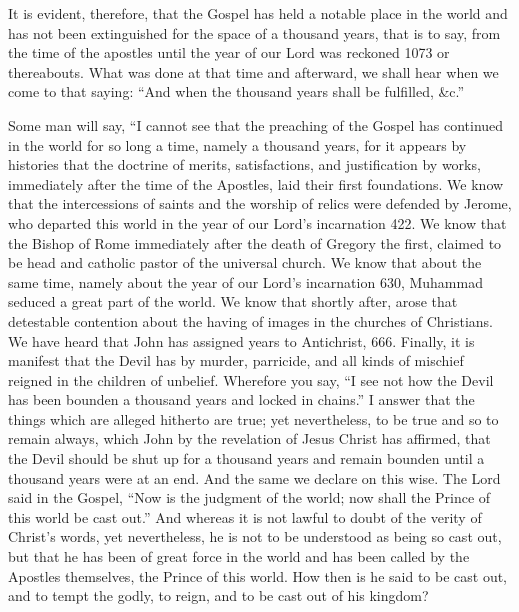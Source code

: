 It is evident, therefore, that the Gospel has held a notable place in the world and has not been extinguished for the space of a thousand years, that is to say, from the time of the apostles until the year of our Lord was reckoned 1073 or thereabouts. What was done at that time and afterward, we shall hear when we come to that saying: “And when the thousand years shall be fulfilled, \&c.”

Some man will say, “I cannot see that the preaching of the Gospel has continued in the world for so long a time, namely a thousand years, for it appears by histories that the doctrine of merits, satisfactions, and justification by works, immediately after the time of the Apostles, laid their first foundations. We know that the intercessions of saints and the worship of relics were defended by Jerome, who departed this world in the year of our Lord’s incarnation 422. We know that the Bishop of Rome immediately after the death of Gregory the first, claimed to be head and catholic pastor of the universal church. We know that about the same time, namely about the year of our Lord’s incarnation 630, Muhammad seduced a great part of the world. We know that shortly after, arose that detestable contention about the having of images in the churches of Christians. We have heard that John has assigned years to Antichrist, 666. Finally, it is manifest that the Devil has by murder, parricide, and all kinds of mischief reigned in the children of unbelief. Wherefore you say, “I see not how the Devil has been bounden a thousand years and locked in chains.” I answer that the things which are alleged hitherto are true; yet nevertheless, to be true and so to remain always, which John by the revelation of Jesus Christ has affirmed, that the Devil should be shut up for a thousand years and remain bounden until a thousand years were at an end. And the same we declare on this wise. The Lord said in the Gospel, “Now is the judgment of the world; now shall the Prince of this world be cast out.” And whereas it is not lawful to doubt of the verity of Christ's words, yet nevertheless, he is not to be understood as being so cast out, but that he has been of great force in the world and has been called by the Apostles themselves, the Prince of this world. How then is he said to be cast out, and to tempt the godly, to reign, and to be cast out of his kingdom?

